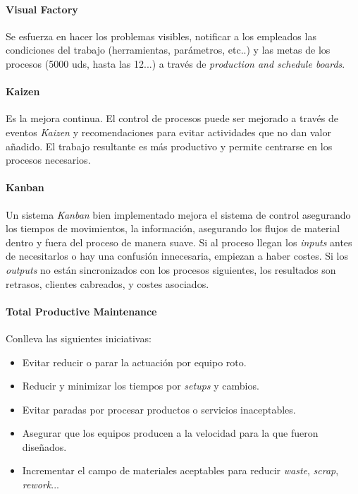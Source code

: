 \documentclass[]{article}
\begin{document}
\paragraph{Visual Factory}

Se esfuerza en hacer los problemas visibles, notificar a los empleados las condiciones del trabajo (herramientas, parámetros, etc..) y las metas de los procesos (5000 uds, hasta las 12...) a través de \textit{production and schedule boards}.

\paragraph{Kaizen}
Es la mejora continua. El control de procesos puede ser mejorado a través de eventos \textit{Kaizen} y recomendaciones para evitar actividades que no dan valor añadido. El trabajo resultante es más productivo y permite centrarse en los procesos necesarios.

\paragraph{Kanban}
Un sistema \textit{Kanban} bien implementado mejora el sistema de control asegurando los tiempos de movimientos, la información, asegurando los flujos de material dentro y fuera del proceso de manera suave. Si al proceso llegan los \textit{inputs} antes de necesitarlos o hay una confusión innecesaria, empiezan a haber costes. Si los \textit{outputs} no están sincronizados con los procesos siguientes, los resultados son retrasos, clientes cabreados, y costes asociados.

\paragraph{Total Productive Maintenance}

Conlleva las siguientes iniciativas: \begin{itemize}
	\item Evitar reducir o parar la actuación por equipo roto.
	\item Reducir y minimizar los tiempos por \textit{setups} y cambios.
	\item Evitar paradas por procesar productos o servicios inaceptables.
	\item Asegurar que los equipos producen a la velocidad para la que fueron diseñados.
	\item Incrementar el campo de materiales aceptables para reducir \textit{waste}, \textit{scrap}, \textit{rework}...
\end{itemize}
\end{document}
